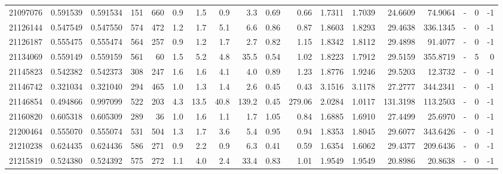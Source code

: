 \begin{tabular}{rrrrrrrrrrrrrrrlrr}
  21097076 & 0.591539 &   0.591534 &  151 &  660 &      0.9 &      1.5 &     0.9 &      3.3 &       0.69 &        0.66 &  1.7311 &  1.7039 &   24.6609 &   74.9064 &             - &        0 &         -1 \\
  21126144 & 0.547549 &   0.547550 &  574 &  472 &      1.2 &      1.7 &     5.1 &      6.6 &       0.86 &        0.87 &  1.8603 &  1.8293 &   29.4638 &  336.1345 &             - &        0 &         -1 \\
  21126187 & 0.555475 &   0.555474 &  564 &  257 &      0.9 &      1.2 &     1.7 &      2.7 &       0.82 &        1.15 &  1.8342 &  1.8112 &   29.4898 &   91.4077 &             - &        0 &         -1 \\
  21134069 & 0.559149 &   0.559159 &  561 &   60 &      1.5 &      5.2 &     4.8 &     35.5 &       0.54 &        1.02 &  1.8223 &  1.7912 &   29.5159 &  355.8719 &             - &        5 &          0 \\
  21145823 & 0.542382 &   0.542373 &  308 &  247 &      1.6 &      1.6 &     4.1 &      4.0 &       0.89 &        1.23 &  1.8776 &  1.9246 &   29.5203 &   12.3732 &             - &        0 &         -1 \\
  21146742 & 0.321034 &   0.321040 &  294 &  465 &      1.0 &      1.3 &     1.4 &      2.6 &       0.45 &        0.43 &  3.1516 &  3.1178 &   27.2777 &  344.2341 &             - &        0 &         -1 \\
  21146854 & 0.494866 &   0.997099 &  522 &  203 &      4.3 &     13.5 &    40.8 &    139.2 &       0.45 &      279.06 &  2.0284 &  1.0117 &  131.3198 &  113.2503 &             - &        0 &         -1 \\
  21160820 & 0.605318 &   0.605309 &  289 &   36 &      1.0 &      1.6 &     1.1 &      1.7 &       1.05 &        0.84 &  1.6885 &  1.6910 &   27.4499 &   25.6970 &             - &        0 &         -1 \\
  21200464 & 0.555070 &   0.555074 &  531 &  504 &      1.3 &      1.7 &     3.6 &      5.4 &       0.95 &        0.94 &  1.8353 &  1.8045 &   29.6077 &  343.6426 &             - &        0 &         -1 \\
  21210238 & 0.624435 &   0.624436 &  586 &  271 &      0.9 &      2.2 &     0.9 &      6.3 &       0.41 &        0.59 &  1.6354 &  1.6062 &   29.4377 &  209.6436 &             - &        0 &         -1 \\
  21215819 & 0.524380 &   0.524392 &  575 &  272 &      1.1 &      4.0 &     2.4 &     33.4 &       0.83 &        1.01 &  1.9549 &  1.9549 &   20.8986 &   20.8638 &             - &        0 &         -1 \\

\end{tabular}
